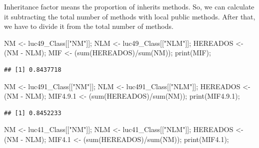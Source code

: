 \documentclass[
]{article}
\newenvironment{Shaded}{\begin{snugshade}}{\end{snugshade}}
\newcommand{\FloatTok}[1]{\textcolor[rgb]{0.00,0.00,0.81}{#1}}
\newcommand{\FunctionTok}[1]{\textcolor[rgb]{0.00,0.00,0.00}{#1}}
\newcommand{\NormalTok}[1]{#1}
\newcommand{\OtherTok}[1]{\textcolor[rgb]{0.56,0.35,0.01}{#1}}
\newcommand{\SpecialCharTok}[1]{\textcolor[rgb]{0.00,0.00,0.00}{#1}}
\newcommand{\StringTok}[1]{\textcolor[rgb]{0.31,0.60,0.02}{#1}}
\begin{document}
Inheritance factor means the proportion of inherits methods. So, we can
calculate it subtracting the total number of methods with local public
methods. After that, we have to divide it from the total number of
methods.

\begin{Shaded}
\begin{Highlighting}[]
\NormalTok{NM }\OtherTok{\textless{}{-}}\NormalTok{ luc49\_Class[[}\StringTok{"NM"}\NormalTok{]];}
\NormalTok{NLM }\OtherTok{\textless{}{-}}\NormalTok{ luc49\_Class[[}\StringTok{"NLM"}\NormalTok{]];}
\NormalTok{HEREADOS }\OtherTok{\textless{}{-}}\NormalTok{ (NM }\SpecialCharTok{{-}}\NormalTok{ NLM);}
\NormalTok{MIF }\OtherTok{\textless{}{-}}\NormalTok{ (}\FunctionTok{sum}\NormalTok{(HEREADOS)}\SpecialCharTok{/}\FunctionTok{sum}\NormalTok{(NM));}
\FunctionTok{print}\NormalTok{(MIF);}
\end{Highlighting}
\end{Shaded}

\begin{verbatim}
## [1] 0.8437718
\end{verbatim}

\begin{Shaded}
\begin{Highlighting}[]
\NormalTok{NM }\OtherTok{\textless{}{-}}\NormalTok{ luc491\_Class[[}\StringTok{"NM"}\NormalTok{]];}
\NormalTok{NLM }\OtherTok{\textless{}{-}}\NormalTok{ luc491\_Class[[}\StringTok{"NLM"}\NormalTok{]];}
\NormalTok{HEREADOS }\OtherTok{\textless{}{-}}\NormalTok{ (NM }\SpecialCharTok{{-}}\NormalTok{ NLM);}
\NormalTok{MIF4.}\FloatTok{9.1} \OtherTok{\textless{}{-}}\NormalTok{ (}\FunctionTok{sum}\NormalTok{(HEREADOS)}\SpecialCharTok{/}\FunctionTok{sum}\NormalTok{(NM));}
\FunctionTok{print}\NormalTok{(MIF4.}\FloatTok{9.1}\NormalTok{);}
\end{Highlighting}
\end{Shaded}

\begin{verbatim}
## [1] 0.8452233
\end{verbatim}

\begin{Shaded}
\begin{Highlighting}[]
\NormalTok{NM }\OtherTok{\textless{}{-}}\NormalTok{ luc41\_Class[[}\StringTok{"NM"}\NormalTok{]];}
\NormalTok{NLM }\OtherTok{\textless{}{-}}\NormalTok{ luc41\_Class[[}\StringTok{"NLM"}\NormalTok{]];}
\NormalTok{HEREADOS }\OtherTok{\textless{}{-}}\NormalTok{ (NM }\SpecialCharTok{{-}}\NormalTok{ NLM);}
\NormalTok{MIF4}\FloatTok{.1} \OtherTok{\textless{}{-}}\NormalTok{ (}\FunctionTok{sum}\NormalTok{(HEREADOS)}\SpecialCharTok{/}\FunctionTok{sum}\NormalTok{(NM));}
\FunctionTok{print}\NormalTok{(MIF4}\FloatTok{.1}\NormalTok{);}
\end{Highlighting}
\end{Shaded}
\end{document}
